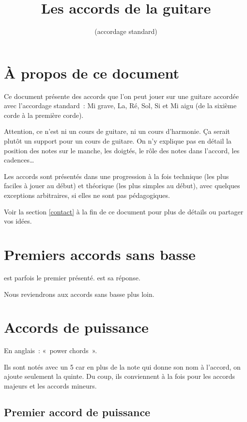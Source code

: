 \documentclass[11pt]{article}
\title{\vspace{-5em}Les accords de la guitare}
\author{(accordage standard)}
\date{}
\begin{document}
\maketitle

\section{À propos de ce document}

Ce document présente des accords que l’on peut jouer sur une guitare accordée
avec l’accordage standard~: Mi grave, La, Ré, Sol, Si et Mi aigu (de la
sixième corde à la première corde).

Attention, ce n’est ni un cours de guitare, ni un cours d’harmonie.
Ça serait plutôt un support pour un cours de guitare. On n’y explique pas en
détail la position des notes sur le manche, les doigtés, le rôle des notes dans
l’accord, les cadences…

Les accords sont présentés dans une progression à la fois technique (les plus
faciles à jouer au début) et théorique (les plus simples au début), avec
quelques exceptions arbitraires, si elles ne sont pas pédagogiques.

Voir la section \ref{contact} à la fin de ce document pour plus de détails ou
partager vos idées.

\section{Premiers accords sans basse}

 est parfois le premier présenté.
\hspace{2em}
 est sa réponse.

Nous reviendrons aux accords sans basse plus loin.

\section{Accords de puissance}

En anglais~: «~power chords~».

Ils sont notés avec un 5 car en plus de la note qui donne son nom à l’accord,
on ajoute seulement la quinte. Du coup, ils conviennent à la fois pour les
accords majeurs et les accords mineurs.

\subsection{Premier accord de puissance}
\end{document}
